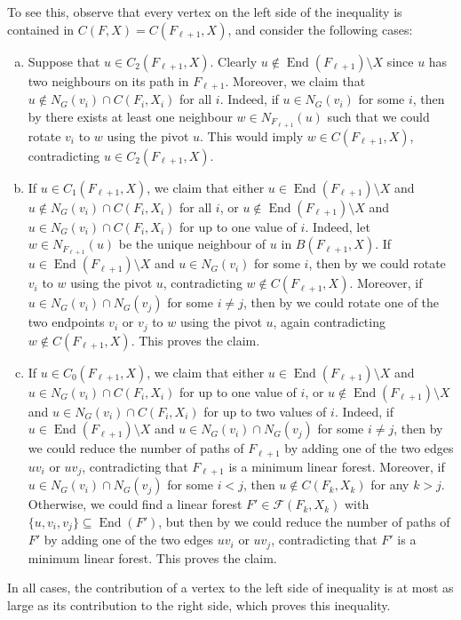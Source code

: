 \documentclass[11pt]{article}
\makeatletter
\theoremstyle{plain}
\theoremstyle{definition}
\renewenvironment{proof}[1][\proofname]
{\par\pushQED{\qed}
	\normalfont\topsep6\p@\@plus6\p@\relax\trivlist
	\item[\hskip\labelsep\bfseries#1\@addpunct{.}]
	\ignorespaces}
{\popQED\endtrivlist\@endpefalse}
\newcommand{\cF}{\mathcal F}
\DeclareMathOperator{\End}{End}
\makeatother
\begin{document}
\begin{proof}[Proof of \cref{prop:componentsize}]
\begin{equation}
    \end{equation}
    To see this, observe that every vertex on the left side of the inequality is contained in $C(F,X) = C(F_{\ell+1},X)$, and consider the following cases:
    \begin{enumerate}[(a)]
        \item Suppose that $u \in C_2(F_{\ell+1},X)$. Clearly $u \notin \End(F_{\ell+1}) \setminus X$ since $u$ has two neighbours on its path in $F_{\ell+1}$. Moreover, we claim that $u \notin N_G(v_i) \cap C(F_i,X_i)$ for all $i$. Indeed, if $u \in N_G(v_i)$ for some $i$, then by  there exists at least one neighbour $w \in N_{F_{\ell+1}}(u)$ such that we could rotate $v_i$ to $w$ using the pivot $u$. This would imply $w \in C(F_{\ell+1},X)$, contradicting $u \in C_2(F_{\ell+1},X)$.
        \item If $u \in C_1(F_{\ell+1},X)$, we claim that either $u \in \End(F_{\ell+1}) \setminus X$ and $u \notin N_G(v_i) \cap C(F_i,X_i)$ for all $i$, or $u \notin \End(F_{\ell+1}) \setminus X$ and $u \in N_G(v_i) \cap C(F_i,X_i)$ for up to one value of $i$. Indeed, let $w \in N_{F_{\ell+1}}(u)$ be the unique neighbour of $u$ in $B(F_{\ell+1},X)$. If $u \in \End(F_{\ell+1}) \setminus X$ and $u \in N_G(v_i)$ for some $i$, then by  we could rotate $v_i$ to $w$ using the pivot $u$, contradicting $w \notin C(F_{\ell+1},X)$. Moreover, if $u \in N_G(v_i) \cap N_G(v_j)$ for some $i \neq j$, then by  we could rotate one of the two endpoints $v_i$ or $v_j$ to $w$ using the pivot $u$, again contradicting $w \notin C(F_{\ell+1},X)$. This proves the claim.
        \item If $u \in C_0(F_{\ell+1},X)$, we claim that either $u \in \End(F_{\ell+1}) \setminus X$ and $u \in N_G(v_i) \cap C(F_i,X_i)$ for up to one value of $i$, or $u \notin \End(F_{\ell+1}) \setminus X$ and $u \in N_G(v_i) \cap C(F_i,X_i)$ for up to two values of $i$. Indeed, if $u \in \End(F_{\ell+1}) \setminus X$ and $u \in N_G(v_i) \cap N_G(v_j)$ for some $i \neq j$, then by  we could reduce the number of paths of $F_{\ell+1}$ by adding one of the two edges $u v_i$ or $u v_j$, contradicting that $F_{\ell+1}$ is a minimum linear forest. Moreover, if $u \in N_G(v_i) \cap N_G(v_j)$ for some $i < j$, then $u \notin C(F_k,X_k)$ for any $k > j$. Otherwise, we could find a linear forest $F' \in \cF(F_k,X_k)$ with $\{u, v_i, v_j\} \subseteq \End(F')$, but then by  we could reduce the number of paths of $F'$ by adding one of the two edges $u v_i$ or $u v_j$, contradicting that $F'$ is a minimum linear forest. This proves the claim.
    \end{enumerate}
    In all cases, the contribution of a vertex to the left side of inequality  is at most as large as its contribution to the right side, which proves this inequality.


\end{proof}
\end{document}
